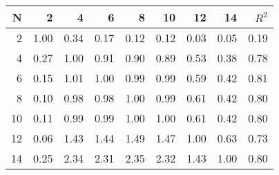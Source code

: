 \begin{tabular}{rrrrrrrrr}
\toprule
  N &     2 &     4 &     6 &     8 &    10 &    12 &    14 &  $R^2$ \\
\midrule
  2 &  1.00 &  0.34 &  0.17 &  0.12 &  0.12 &  0.03 &  0.05 &   0.19 \\
  4 &  0.27 &  1.00 &  0.91 &  0.90 &  0.89 &  0.53 &  0.38 &   0.78 \\
  6 &  0.15 &  1.01 &  1.00 &  0.99 &  0.99 &  0.59 &  0.42 &   0.81 \\
  8 &  0.10 &  0.98 &  0.98 &  1.00 &  0.99 &  0.61 &  0.42 &   0.80 \\
 10 &  0.11 &  0.99 &  0.99 &  1.00 &  1.00 &  0.61 &  0.42 &   0.80 \\
 12 &  0.06 &  1.43 &  1.44 &  1.49 &  1.47 &  1.00 &  0.63 &   0.73 \\
 14 &  0.25 &  2.34 &  2.31 &  2.35 &  2.32 &  1.43 &  1.00 &   0.80 \\
\bottomrule
\end{tabular}
